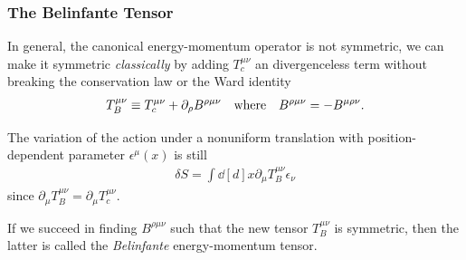 \documentclass[10pt]{article}
\begin{document}
\subsubsection{The Belinfante Tensor\label{subsubsec:The_Belinfante_Tensor}}
\begin{intu}
    In general, the canonical energy-momentum operator is not symmetric, we can make it symmetric \textit{classically} by adding $T^{\mu\nu}_c$ an divergenceless term without breaking the conservation law or the Ward identity
    \begin{align}
        T^{\mu\nu}_B\equiv T^{\mu\nu}_c+\partial_{\rho}B^{\rho\mu\nu}\qq{where}B^{\rho\mu\nu}=-B^{\mu\rho\nu}.\label{eq:Belinfante:def}
    \end{align}
\end{intu}
The variation of the action under a nonuniform translation with position-dependent parameter $\epsilon^\mu(x)$ is still
\begin{align}
    \delta S=\int\dd[d]{x}\partial_\mu T^{\mu\nu}_B\epsilon_\nu
\end{align}
since $\partial_\mu T^{\mu\nu}_B=\partial_\mu T^{\mu\nu}_c$.

If we succeed in finding $B^{\rho\mu\nu}$ such that the new tensor $T^{\mu\nu}_B$ is symmetric, then the latter is called the \textit{Belinfante} energy-momentum tensor.
\end{document}
